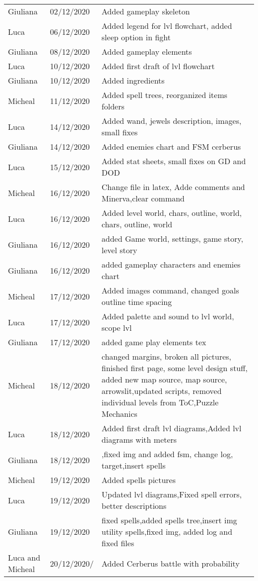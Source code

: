 \begin{longtable}{ m{2cm}m{3cm}m{8cm}}
Giuliana & 02/12/2020 &  Added gameplay skeleton\\
Luca & 06/12/2020 & Added legend for lvl flowchart, added sleep option in fight \\
Giuliana & 08/12/2020 & Added gameplay elements\\
Luca & 10/12/2020 & Added first draft of lvl flowchart\\
Giuliana & 10/12/2020 & Added ingredients\\
Micheal & 11/12/2020 & Added spell trees, reorganized items folders\\
Luca & 14/12/2020 &Added wand, jewels description, images, small fixes \\
Giuliana & 14/12/2020 & Added enemies chart and FSM cerberus\\
Luca & 15/12/2020 &  Added stat sheets, small fixes on GD and DOD\\
Micheal & 16/12/2020 & Change file in latex, Adde comments and Minerva,clear command \\
Luca & 16/12/2020 & Added level world, chars, outline, world, chars, outline, world\\
Giuliana & 16/12/2020 & added Game world, settings, game story, level story\\
Giuliana & 16/12/2020 & added gameplay characters and enemies chart\\
Micheal & 17/12/2020 & Added images command, changed goals outline time spacing\\
Luca & 17/12/2020 & Added palette and sound to lvl world, scope lvl\\
Giuliana & 17/12/2020 & added game play elements tex\\
Micheal & 18/12/2020 & changed margins, broken all pictures, finished first page, some level design stuff, added new map source, map source, arrowslit,updated scripts, removed individual levels from ToC,Puzzle Mechanics\\
Luca & 18/12/2020 & Added first draft lvl diagrams,Added lvl diagrams with meters\\
Giuliana & 18/12/2020 & ,fixed img and added fsm, change log, target,insert spells\\
Micheal & 19/12/2020 & Added spells pictures\\
Luca & 19/12/2020 & Updated lvl diagrams,Fixed spell errors, better descriptions\\
Giuliana & 19/12/2020 & fixed spells,added spells tree,insert img utility spells,fixed img, added log and fixed files\\
Luca and Micheal & 20/12/2020/ & Added Cerberus battle with probability \\


\end{longtable}

\pagebreak
